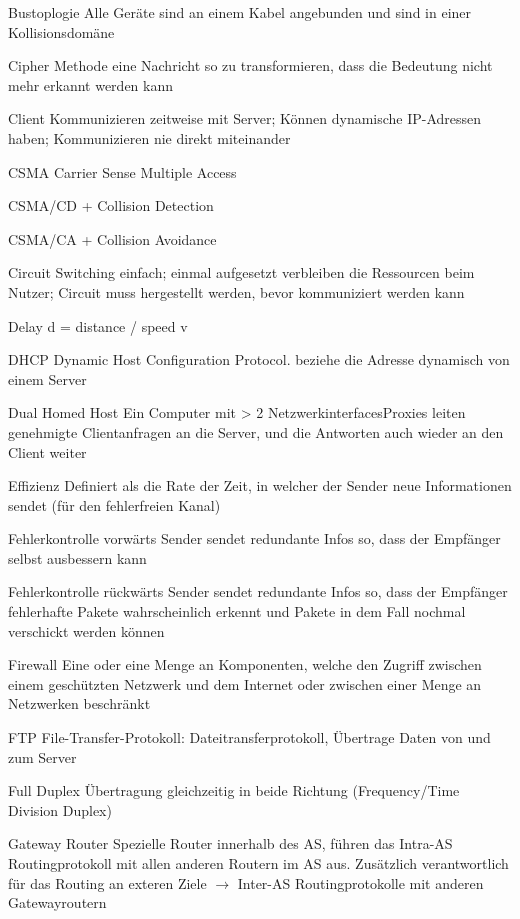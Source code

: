 \documentclass[a4paper]{article}
\begin{document}
\begin{multicols}{3}
\begin{description*}
        \item[Bustoplogie] Alle Geräte sind an einem Kabel angebunden und sind in einer Kollisionsdomäne
        \item[Cipher] Methode eine Nachricht so zu transformieren, dass die Bedeutung nicht mehr erkannt werden kann
        \item[Client] Kommunizieren zeitweise mit Server; Können dynamische IP-Adressen haben; Kommunizieren nie direkt miteinander
        \item[CSMA] Carrier Sense Multiple Access
        \item[CSMA/CD] + Collision Detection
        \item[CSMA/CA] + Collision Avoidance
        \item[Circuit Switching] einfach; einmal aufgesetzt verbleiben die Ressourcen beim Nutzer; Circuit muss hergestellt werden, bevor kommuniziert werden kann
        \item[Delay d] = distance / speed v
        \item[DHCP] Dynamic Host Configuration Protocol. beziehe die Adresse dynamisch von einem Server
        \item[Dual Homed Host] Ein Computer mit > 2 NetzwerkinterfacesProxies leiten genehmigte Clientanfragen an die Server, und die Antworten auch wieder an den Client weiter
        \item[Effizienz] Definiert als die Rate der Zeit, in welcher der Sender neue Informationen sendet (für den fehlerfreien Kanal)
        \item[Fehlerkontrolle vorwärts] Sender sendet redundante Infos so, dass der Empfänger selbst ausbessern kann
        \item[Fehlerkontrolle rückwärts] Sender sendet redundante Infos so, dass der Empfänger fehlerhafte Pakete wahrscheinlich erkennt und Pakete in dem Fall nochmal verschickt werden können
        \item[Firewall] Eine oder eine Menge an Komponenten, welche den Zugriff zwischen einem geschützten Netzwerk und dem Internet oder zwischen einer Menge an Netzwerken beschränkt
        \item[FTP] File-Transfer-Protokoll: Dateitransferprotokoll, Übertrage Daten von und zum Server
        \item[Full Duplex] Übertragung gleichzeitig in beide Richtung (Frequency/Time Division Duplex)
        \item[Gateway Router] Spezielle Router innerhalb des AS, führen das Intra-AS Routingprotokoll mit allen anderen Routern im AS aus. Zusätzlich verantwortlich für das Routing an exteren Ziele $\rightarrow$ Inter-AS Routingprotokolle mit anderen Gatewayroutern

\end{description*}
\end{multicols}
\end{document}
